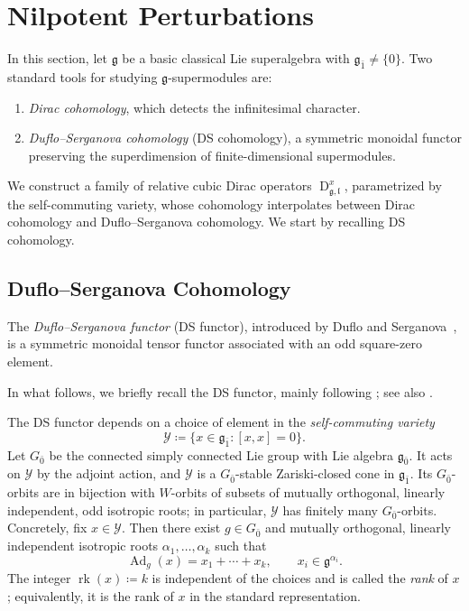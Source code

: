 \documentclass[11pt]{amsart}
\newcommand{\Dirac}{\operatorname{D}}
\def\rk{{\operatorname{rk}}}
\def\ll{{\mathfrak l}}
\def\YY{{\mathcal Y}}
\def\even{{\mathfrak{g}_{\bar{0}}}}
\def\odd{{\mathfrak{g}_{\bar{1}}}}
\def\gg{{\mathfrak{g}}}
\newcommand{\Ad}{\operatorname{Ad}}
\theoremstyle{plain}
\theoremstyle{remark}
\theoremstyle{definition}
\numberwithin{equation}{section}
\theoremstyle{remark}
\begin{document}
\section{Nilpotent Perturbations} \label{sec::nilpotent_perturbations}
In this section, let $\gg$ be a basic classical Lie superalgebra with $\odd\neq\{0\}$. Two standard tools for studying $\gg$-supermodules are:
\begin{enumerate}
 \item \emph{Dirac cohomology}, which detects the infinitesimal character.
 \item \emph{Duflo--Serganova cohomology} (DS cohomology), a symmetric monoidal functor preserving the superdimension of finite-dimensional supermodules.
\end{enumerate}
We construct a family of relative cubic Dirac operators $\Dirac_{\gg,\ll}^{x}$, parametrized by the self-commuting variety, whose cohomology interpolates between Dirac cohomology and Duflo--Serganova cohomology. We start by recalling DS cohomology.


\subsection{Duflo--Serganova Cohomology} \label{subsec::Duflo_Serganova_Cohomology} The \emph{Duflo--Serganova functor} (DS functor), introduced by Duflo and Serganova~\cite{duflo2005associated}, is a symmetric monoidal tensor functor associated with an odd square-zero element. 

In what follows, we briefly recall the DS functor, mainly following
\cite{duflo2005associated,gorelik2022duflo}; see also \cite{serganova2011superdimension}.

The DS functor depends on a choice of element in the \emph{self-commuting variety}
\begin{equation}
 \YY\coloneqq \{x\in\odd:[x,x]=0\}.
\end{equation}
Let $G_{\bar{0}}$ be the connected simply connected Lie group with Lie algebra $\even$. It acts on $\YY$ by the adjoint action, and $\YY$ is a $G_{\bar 0}$-stable Zariski-closed cone in $\odd$. Its $G_{\bar 0}$-orbits are in bijection with $W$-orbits of subsets of mutually orthogonal, linearly independent, odd isotropic roots; in particular, $\YY$ has finitely many $G_{\bar 0}$-orbits. Concretely, fix $x\in\YY$. Then there exist $g\in G_{\bar 0}$ and mutually orthogonal, linearly independent isotropic roots
$\alpha_1,\dots,\alpha_k$ such that
\begin{equation}\Ad_g(x)=x_1+\cdots+x_k,\qquad x_i\in\gg^{\alpha_i}.
\end{equation}
The integer $\rk(x)\coloneqq k$ is independent of the choices and is called the \emph{rank} of $x$; equivalently, it is the rank of $x$ in the standard representation.
\end{document}
